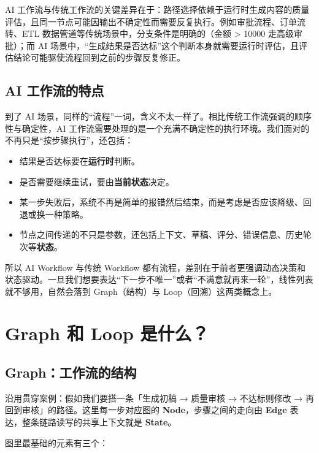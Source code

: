 \documentclass[10pt,a4paper]{ctexart}
\begin{document}
AI 工作流与传统工作流的关键差异在于：路径选择依赖于运行时生成内容的质量评估，且同一节点可能因输出不确定性而需要反复执行。例如审批流程、订单流转、ETL 数据管道等传统场景中，分支条件是明确的（金额 > 10000 走高级审批）；而 AI 场景中，“生成结果是否达标”这个判断本身就需要运行时评估，且评估结论可能驱使流程回到之前的步骤反复修正。



\subsection{AI 工作流的特点}


到了 AI 场景，同样的“流程”一词，含义不太一样了。相比传统工作流强调的顺序性与确定性，AI 工作流需要处理的是一个充满不确定性的执行环境。我们面对的不再只是“按步骤执行”，还包括：


\begin{itemize}[itemsep=2pt, topsep=4pt]
  \item 结果是否达标要在\textbf{运行时}判断。
  \item 是否需要继续重试，要由\textbf{当前状态}决定。
  \item 某一步失败后，系统不再是简单的报错然后结束，而是考虑是否应该降级、回退或换一种策略。
  \item 节点之间传递的不只是参数，还包括上下文、草稿、评分、错误信息、历史轮次等\textbf{状态}。
\end{itemize}


所以 AI Workflow 与传统 Workflow 都有流程，差别在于前者更强调动态决策和状态驱动。一旦我们想要表达“下一步不唯一”或者“不满意就再来一轮”，线性列表就不够用，自然会落到 Graph（结构）与 Loop（回溯）这两类概念上。



\section{Graph 和 Loop 是什么？}


\subsection{Graph：工作流的结构}


沿用贯穿案例：假如我们要搭一条「生成初稿 → 质量审核 → 不达标则修改 → 再回到审核」的路径。这里每一步对应图的 \textbf{Node}，步骤之间的走向由 \textbf{Edge} 表达，整条链路读写的共享上下文就是 \textbf{State}。



图里最基础的元素有三个：
\end{document}
